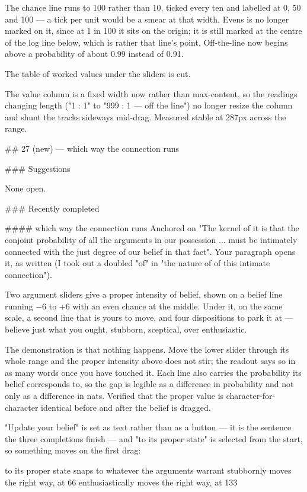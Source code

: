 The chance line runs to 100 rather than 10, ticked every ten and labelled at 0,
50 and 100 — a tick per unit would be a smear at that width. Evens is no longer
marked on it, since at 1 in 100 it sits on the origin; it is still marked at the
centre of the log line below, which is rather that line's point. Off-the-line
now begins above a probability of about 0.99 instead of 0.91.

The table of worked values under the sliders is cut.

The value column is a fixed width now rather than max-content, so the readings
changing length ("1 : 1" to "999 : 1 — off the line") no longer resize the
column and shunt the tracks sideways mid-drag. Measured stable at 287px across
the range.


## 27 (new) — which way the connection runs

### Suggestions

None open.

### Recently completed

#### which way the connection runs
Anchored on "The kernel of it is that the conjoint probability of all the
arguments in our possession ... must be intimately connected with the just
degree of our belief in that fact". Your paragraph opens it, as written (I took
out a doubled "of" in "the nature of of this intimate connection").

Two argument sliders give a proper intensity of belief, shown on a belief line
running −6 to +6 with an even chance at the middle. Under it, on the same scale,
a second line that is yours to move, and four dispositions to park it at —
believe just what you ought, stubborn, sceptical, over enthusiastic.

The demonstration is that nothing happens. Move the lower slider through its
whole range and the proper intensity above does not stir; the readout says so in
as many words once you have touched it. Each line also carries the probability
its belief corresponds to, so the gap is legible as a difference in probability
and not only as a difference in nats. Verified that the proper value is
character-for-character identical before and after the belief is dragged.

"Update your belief" is set as text rather than as a button — it is the
sentence the three completions finish — and "to its proper state" is selected
from the start, so something moves on the first drag:

  to its proper state   snaps to whatever the arguments warrant
  stubbornly            moves the right way, at 66%
  enthusiastically      moves the right way, at 133%

